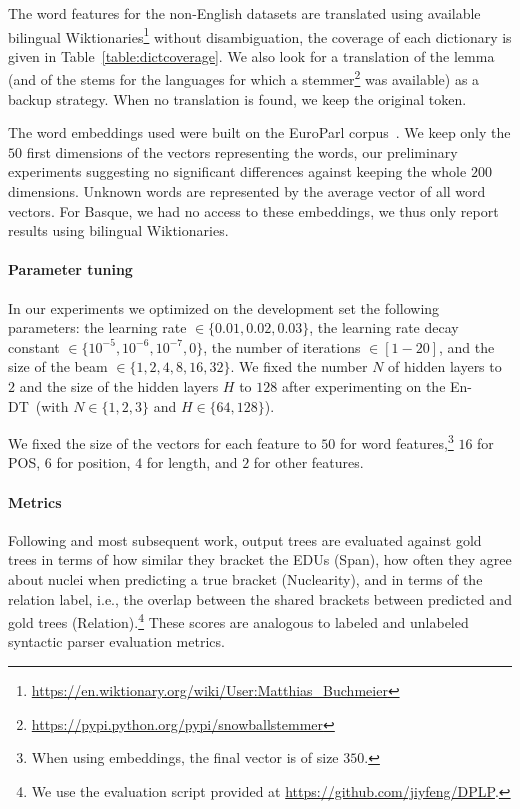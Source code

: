 \documentclass[11pt]{article}
\newcommand{\erstdt}{En-DT}
\begin{document}
The word features for the non-English datasets are translated using available bilingual Wiktionaries\footnote{\url{https://en.wiktionary.org/wiki/User:Matthias_Buchmeier}} without disambiguation, the coverage of each dictionary is given in Table~\ref{table:dictcoverage}.
We also look for a translation of the lemma (and of the stems for the languages for which a stemmer\footnote{\url{https://pypi.python.org/pypi/snowballstemmer}} was available) as a backup strategy. 
When no translation is found, we keep the original token.

The word embeddings used were built on the EuroParl corpus~\cite{levy:strong:2017}. We keep only the $50$ first dimensions of the vectors representing the words, our preliminary experiments suggesting no significant differences against keeping the whole $200$ dimensions.
Unknown words are represented by the average vector of all word vectors.
For Basque, we had no access to these embeddings, we thus only report results using bilingual Wiktionaries.


\paragraph{Parameter tuning}
In our experiments we optimized on the development set the following parameters: the learning rate $\in \{0.01,0.02,0.03\}$, the learning rate decay constant $\in \{10^{-5},10^{-6},10^{-7},0\}$, the number of iterations $\in [1-20]$, and the size of the beam $\in \{1,2,4,8,16,32\}$. We fixed the number $N$ of hidden layers to $2$ and the size of the hidden layers $H$ to $128$ after experimenting on the \erstdt\ (with $N \in \{1,2,3\}$ and $H \in \{64,128\}$).

We fixed the size of the vectors for each feature to $50$ for word features,\footnote{When using embeddings, the final vector is of size $350$.} $16$ for POS, $6$ for position, $4$ for length, and $2$ for other features.

\paragraph{Metrics}

Following \cite{marcu:theory:2000} and most subsequent work, output trees are evaluated against gold trees in terms of how similar they bracket the EDUs (Span), how often they agree about nuclei when predicting a true bracket (Nuclearity), and in terms of the relation label, i.e., the overlap between the shared brackets between predicted and gold trees (Relation).\footnote{We use the evaluation script provided at \url{https://github.com/jiyfeng/DPLP}.} These scores are analogous to labeled and unlabeled syntactic parser evaluation metrics. 
\end{document}
